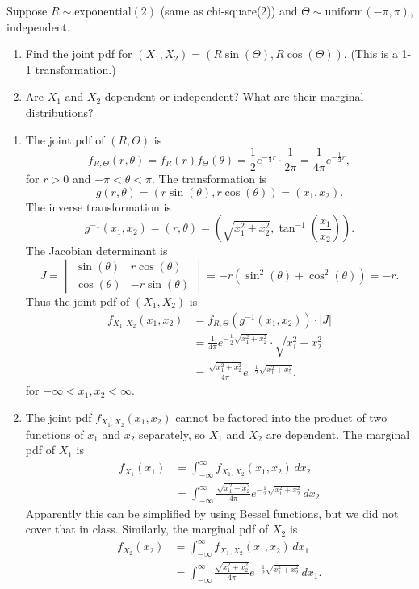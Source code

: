 \documentclass[12pt]{article}
\newenvironment{problem}[2][Problem]{\begin{trivlist}
\item[\hskip \labelsep {\bfseries #1}\hskip \labelsep {\bfseries #2.}]}
{\end{trivlist}}
\begin{document}
\begin{problem}{2}
  Suppose $R \sim \text{exponential}(2)$ (same as chi-square(2)) 
  and $\Theta \sim \text{uniform}(-\pi, \pi)$, independent.
  \begin{enumerate}
    \item Find the joint pdf for $(X_1, X_2) = (R \sin(\Theta), 
    R \cos(\Theta))$. (This is a 1-1 transformation.)
    \item Are $X_1$ and $X_2$ dependent or independent? 
    What are their marginal distributions?
  \end{enumerate}
  \begin{enumerate}
    \item The joint pdf of $(R, \Theta)$ is
    \[
      f_{R, \Theta}(r, \theta) = f_R(r) f_\Theta(\theta) 
      = \frac{1}{2} e^{-\frac{1}{2}r} \cdot \frac{1}{2\pi} 
      = \frac{1}{4\pi} e^{-\frac{1}{2}r},
    \]
    for $r > 0$ and $-\pi < \theta < \pi$. The transformation is
    \[
      g(r, \theta) = (r \sin(\theta), r \cos(\theta)) = (x_1, x_2).
    \]
    The inverse transformation is
    \[
      g^{-1}(x_1, x_2) = (r, \theta) = \left(\sqrt{x_1^2 + x_2^2}, 
      \tan^{-1}\left(\frac{x_1}{x_2}\right)\right).
    \]
    The Jacobian determinant is
    \[
      J = \begin{vmatrix}
        \sin(\theta) & r \cos(\theta) \\
        \cos(\theta) & -r \sin(\theta)
      \end{vmatrix} = -r(\sin^2(\theta) + \cos^2(\theta)) = -r.
    \]
    Thus the joint pdf of $(X_1, X_2)$ is
    \begin{align*}
      f_{X_1, X_2}(x_1, x_2) &= f_{R, \Theta}(g^{-1}(x_1, x_2)) 
      \cdot |J| \\
      &= \frac{1}{4\pi} e^{-\frac{1}{2}\sqrt{x_1^2 + x_2^2}} 
      \cdot \sqrt{x_1^2 + x_2^2} \\
      &= \frac{\sqrt{x_1^2 + x_2^2}}{4\pi} 
      e^{-\frac{1}{2}\sqrt{x_1^2 + x_2^2}},
    \end{align*}
    for $-\infty < x_1, x_2 < \infty$.
    \item The joint pdf $f_{X_1, X_2}(x_1, x_2)$ cannot be factored into
    the product of two functions of $x_1$ and $x_2$ separately, 
    so $X_1$ and $X_2$ are dependent. The marginal pdf of $X_1$ is
    \begin{align*}
      f_{X_1}(x_1) &= \int_{-\infty}^\infty f_{X_1, X_2}(x_1, x_2) \, dx_2 \\
      &= \int_{-\infty}^\infty \frac{\sqrt{x_1^2 + x_2^2}}{4\pi} 
      e^{-\frac{1}{2}\sqrt{x_1^2 + x_2^2}} \, dx_2
    \end{align*}
    Apparently this can be simplified by using Bessel functions, but we
    did not cover that in class. Similarly, the marginal pdf of $X_2$ is
    \begin{align*}
      f_{X_2}(x_2) &= \int_{-\infty}^\infty f_{X_1, X_2}(x_1, x_2) \, dx_1 \\
      &= \int_{-\infty}^\infty \frac{\sqrt{x_1^2 + x_2^2}}{4\pi} 
      e^{-\frac{1}{2}\sqrt{x_1^2 + x_2^2}} \, dx_1.
    \end{align*}
  \end{enumerate}
\end{problem}
\end{document}
